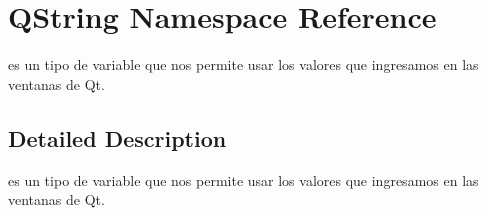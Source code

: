 \hypertarget{namespace_q_string}{}\section{Q\+String Namespace Reference}
\label{namespace_q_string}


es un tipo de variable que nos permite usar los valores que ingresamos en las ventanas de Qt.  




\subsection{Detailed Description}
es un tipo de variable que nos permite usar los valores que ingresamos en las ventanas de Qt. 
